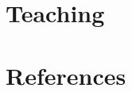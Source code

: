 \documentclass[11pt]{article} %
\begin{document}
% 


\section*{Teaching}
\label{teaching}



\section*{References}
\label{references}

\end{document}
